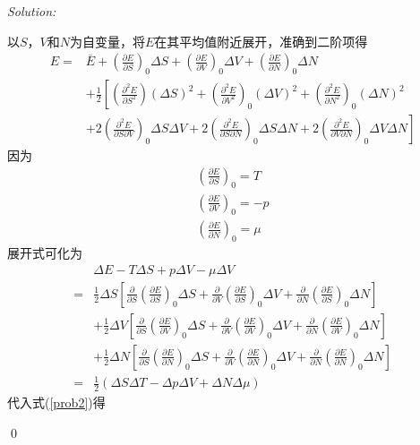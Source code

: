 \documentclass[12pt,a4paper]{article}
\newenvironment{sol}
    {\emph{Solution:}
    }
    {
    \qed
    }
\begin{document}
\begin{sol}
\begin{equation}
\end{equation}
以$S$，$V$和$N$为自变量，将$E$在其平均值附近展开，准确到二阶项得
\begin{align}
\nonumber E=&\overline{E}+\left(\frac{\partial E}{\partial S}\right)_0\Delta S+\left(\frac{\partial E}{\partial V}\right)_0\Delta V+\left(\frac{\partial E}{\partial N}\right)_0\Delta N\\
\nonumber&+\frac{1}{2}\left[\left(\frac{\partial^2E}{\partial S^2}\right)(\Delta S)^2+\left(\frac{\partial^2E}{\partial V^2}\right)_0(\Delta V)^2+\left(\frac{\partial^2E}{\partial N^2}\right)_0(\Delta N)^2\right.\\
&\left.+2\left(\frac{\partial^2E}{\partial S\partial V}\right)_0\Delta S\Delta V+2\left(\frac{\partial^2E}{\partial S\partial N}\right)_0\Delta S\Delta N+2\left(\frac{\partial^2E}{\partial V\partial N}\right)_0\Delta V\Delta N\right]
\end{align}
因为
\begin{gather}
\left(\frac{\partial E}{\partial S}\right)_0=T\\
\left(\frac{\partial E}{\partial V}\right)_0=-p\\
\left(\frac{\partial E}{\partial N}\right)_0=\mu
\end{gather}
展开式可化为
\begin{align}
\nonumber&\Delta E-T\Delta S+p\Delta V-\mu\Delta V\\
\nonumber=&\frac{1}{2}\Delta S\left[\frac{\partial}{\partial S}\left(\frac{\partial E}{\partial S}\right)_0\Delta S+\frac{\partial}{\partial V}\left(\frac{\partial E}{\partial S}\right)_0\Delta V+\frac{\partial}{\partial N}\left(\frac{\partial E}{\partial S}\right)_0\Delta N\right]\\
\nonumber&+\frac{1}{2}\Delta V\left[\frac{\partial}{\partial S}\left(\frac{\partial E}{\partial V}\right)_0\Delta S+\frac{\partial}{\partial V}\left(\frac{\partial E}{\partial V}\right)_0\Delta V+\frac{\partial}{\partial N}\left(\frac{\partial E}{\partial V}\right)_0\Delta N\right]\\
\nonumber&+\frac{1}{2}\Delta N\left[\frac{\partial}{\partial S}\left(\frac{\partial E}{\partial N}\right)_0\Delta S+\frac{\partial}{\partial V}\left(\frac{\partial E}{\partial N}\right)_0\Delta V+\frac{\partial}{\partial N}\left(\frac{\partial E}{\partial N}\right)_0\Delta N\right]\\
=&\frac{1}{2}(\Delta S\Delta T-\Delta p\Delta V+\Delta N\Delta\mu)
\end{align}
代入式(\ref{prob2})得
\begin{equation}

\end{equation}
\end{sol}
\end{document}
